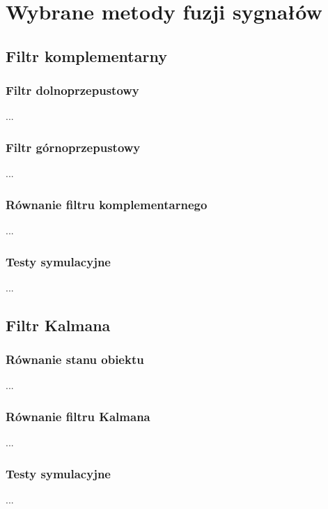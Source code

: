 \chapter{Wybrane metody fuzji sygnałów}
\label{chap:wybrane}

\section{Filtr komplementarny}

\cite{Komplementarny}

\subsection{Filtr dolnoprzepustowy}
...

\subsection{Filtr górnoprzepustowy}
...

\subsection{Równanie filtru komplementarnego}
...

\subsection{Testy symulacyjne}
...
\section{Filtr Kalmana}

\cite{Kalman}

\subsection{Równanie stanu obiektu}
...

\subsection{Równanie filtru Kalmana}
...

\subsection{Testy symulacyjne}
...

